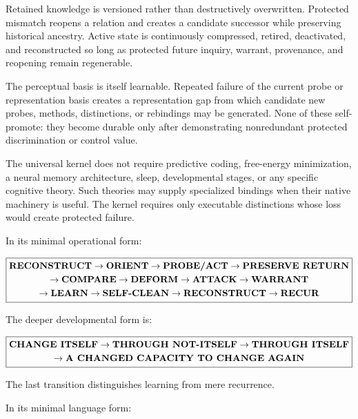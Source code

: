 \documentclass[
]{article}
\begin{document}
Retained knowledge is versioned rather than destructively overwritten.
Protected mismatch reopens a relation and creates a candidate successor while
preserving historical ancestry. Active state is continuously compressed,
retired, deactivated, and reconstructed so long as protected future inquiry,
warrant, provenance, and reopening remain regenerable.

The perceptual basis is itself learnable. Repeated failure of the current probe
or representation basis creates a representation gap from which candidate new
probes, methods, distinctions, or rebindings may be generated. None of these
self-promote: they become durable only after demonstrating nonredundant
protected discrimination or control value.

The universal kernel does not require predictive coding, free-energy
minimization, a neural memory architecture, sleep, developmental stages, or any
specific cognitive theory. Such theories may supply specialized bindings when
their native machinery is useful. The kernel requires only executable
distinctions whose loss would create protected failure.

In its minimal operational form:

\[
\boxed{
\begin{gathered}
\text{\textbf{RECONSTRUCT}}
\to
\text{\textbf{ORIENT}}
\to
\text{\textbf{PROBE/ACT}}
\to
\text{\textbf{PRESERVE RETURN}}\\
\to
\text{\textbf{COMPARE}}
\to
\text{\textbf{DEFORM}}
\to
\text{\textbf{ATTACK}}
\to
\text{\textbf{WARRANT}}\\
\to
\text{\textbf{LEARN}}
\to
\text{\textbf{SELF-CLEAN}}
\to
\text{\textbf{RECONSTRUCT}}
\to
\text{\textbf{RECUR}}
\end{gathered}
}
\]

The deeper developmental form is:

\[
\boxed{
\begin{gathered}
\text{\textbf{CHANGE ITSELF}}
\to
\text{\textbf{THROUGH NOT-ITSELF}}
\to
\text{\textbf{THROUGH ITSELF}}\\
\to
\text{\textbf{A CHANGED CAPACITY TO CHANGE AGAIN}}
\end{gathered}
}
\]

The last transition distinguishes learning from mere recurrence.

In its minimal language form:
\end{document}
